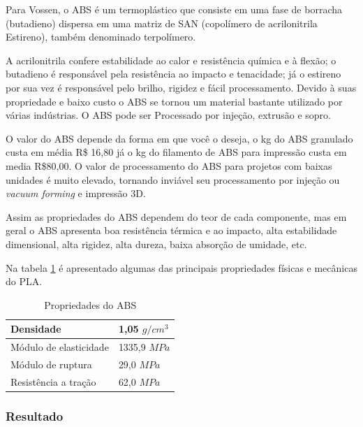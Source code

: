     \par Para  Vossen,  o  ABS é  um  termoplástico  que  consiste em uma  fase  de  borracha  (butadieno)  dispersa  em  uma  matriz de  SAN  (copolímero  de  acrilonitrila  Estireno),  também denominado terpolímero. \cite{vossen2009nanocompositos}
    
	\par A acrilonitrila confere estabilidade ao calor e resistência química e à flexão; o butadieno é responsável pela resistência ao impacto e tenacidade; já o estireno por sua vez é responsável pelo brilho, rigidez e fácil processamento. Devido à suas propriedade e baixo custo o ABS se tornou um material bastante utilizado por várias indústrias. O ABS pode ser Processado por injeção, extrusão e sopro.
	
	\par O valor do ABS depende da forma em que você o deseja, o kg do ABS granulado custa em média R\$ 16,80 já o kg do filamento de ABS para impressão custa em media R\$80,00. O valor de processamento do ABS para projetos com baixas unidades é muito elevado, tornando inviável seu processamento por injeção ou \textit{vacuum forming} e impressão 3D. \cite{abs01}
	
	\par Assim as propriedades do ABS dependem do teor de cada componente, mas em geral o ABS apresenta boa resistência térmica e ao impacto, alta estabilidade dimensional, alta rigidez, alta dureza, baixa absorção de umidade, etc. \cite{junior2014aspectos}
	
	\par Na tabela \ref{tab:ABS} é apresentado algumas das principais propriedades físicas e mecânicas do PLA. \cite{abs}

    \begin{table}[h]
\centering
\begin{tabular}{|l|l|}
\hline
Densidade              & 1,05 $g/cm^3$ \\ \hline
Módulo de elasticidade & 1335,9 $MPa$ \\ \hline
Módulo de ruptura      & 29,0 $MPa$ \\ \hline
Resistência a tração   & 62,0 $MPa$ \\ \hline
\end{tabular}
\caption{Propriedades do ABS}
\label{tab:ABS}
\end{table}

\subsubsection{Resultado}

